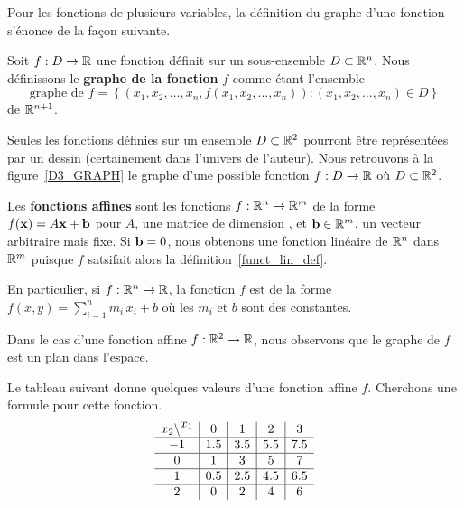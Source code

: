 {Pour les fonctions de plusieurs variables, la définition du graphe
d'une fonction s'énonce de la façon suivante.

\begin{focus}{\dfn} 
Soit $f:D\rightarrow \mathbb{R}$ une fonction définit sur un sous-ensemble
$D\subset \mathbb{R}^n$.  Nous définissons le {\bfseries graphe de la fonction}
$f$ comme étant l'ensemble
\[
\text{graphe de }f = \left\{ (x_1,x_2,\ldots,x_n, f(x_1,x_2,\ldots,x_n))
: (x_1,x_2,\ldots,x_n) \in D \right\}
\]
de $\mathbb{R}^{n+1}$.
\end{focus}

Seules les fonctions définies sur un ensemble $D \subset \mathbb{R}^2$
pourront être représentées par un dessin (certainement dans l'univers
de l'auteur).  Nous retrouvons à la figure~\ref{D3_GRAPH} le
graphe d'une possible fonction
$f:D \rightarrow \mathbb{R}$ où $D\subset \mathbb{R}^2$.  


\begin{focus}{\dfn} 
Les {\bfseries fonctions affines} sont les fonctions
$f:\mathbb{R}^n \to \mathbb{R}^m$ de la forme $f(\mathbf{x}) = A \mathbf{x} + \mathbf{b}$
pour $A$, une matrice de dimension , et $\mathbf{b} \in \mathbb{R}^m$,
un vecteur arbitraire mais fixe.  Si $\mathbf{b}=0$, nous obtenons une
fonction linéaire de $\mathbb{R}^n$ dans $\mathbb{R}^m$ puisque $f$ satsifait alors
la définition~\ref{funct_lin_def}.

En particulier, si $f:\mathbb{R}^n \to \mathbb{R}$, la fonction $f$ est de la forme
$\displaystyle f(x,y) = \sum_{i=1}^n m_i\,x_i +b$ où les $m_i$ et
$b$ sont des constantes.
\end{focus}

Dans le cas d'une fonction affine $f:\mathbb{R}^2 \to \mathbb{R}$, nous observons que le
graphe de $f$ est un plan dans l'espace.

\begin{egg}
Le tableau suivant donne quelques valeurs d'une fonction affine $f$.
Cherchons une formule pour cette fonction.
\[
\begin{array}{c|c|c|c|c}
x_2 \backslash \raisebox{1ex}{$x_1$} & 0 & 1 & 2 & 3 \\
\hline
-1 & 1.5 & 3.5 & 5.5 & 7.5 \\
\hline
0 & 1 & 3 & 5 & 7 \\
\hline
1 & 0.5 & 2.5 & 4.5 & 6.5 \\
\hline
2 & 0 & 2 & 4 & 6
\end{array}
\]


\end{egg}}
